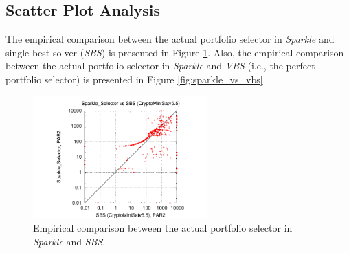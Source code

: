 \documentclass[british]{article}
\begin{document}
\subsection{Scatter Plot Analysis}

The empirical comparison between the actual portfolio selector in \emph{Sparkle} and single best solver (\emph{SBS}) is presented in Figure \ref{fig:sparkle_vs_sbs}. Also, the empirical comparison between the actual portfolio selector in \emph{Sparkle} and \emph{VBS} (i.e., the perfect portfolio selector) is presented in Figure \ref{fig:sparkle_vs_vbs}.


%

\begin{figure}[t]
\noindent \begin{centering}
\includegraphics[width=0.6\textwidth]{figure_portfolio_selector_sparkle_vs_sbs}
\par\end{centering}

\caption{Empirical comparison between the actual portfolio selector in \emph{Sparkle} and \emph{SBS}.}\label{fig:sparkle_vs_sbs}
\end{figure}
\end{document}
